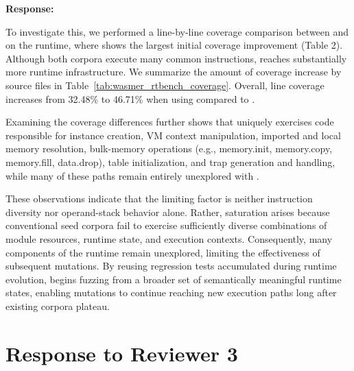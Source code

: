\documentclass[11pt]{article}
\newenvironment{response}{%
    \par\vspace{10pt}
    \par\noindent\textbf{\color{tseblue}Response:}\par\nobreak\ignorespaces
}{%
    \par\vspace{15pt}
}
\newcounter{reviewernum}
\newcounter{cmtcounter}[reviewernum]
\newcommand{\newreviewer}{\stepcounter{reviewernum}\setcounter{cmtcounter}{0}}
\begin{document}
\begin{response}
    To investigate this, we performed a line-by-line coverage comparison between \rtbench{} and \wasmbench{} on the \wasmer{} runtime, where \rtbench{} shows the largest initial coverage improvement (Table 2). Although both corpora execute many common instructions, \rtbench{} reaches substantially more runtime infrastructure. We summarize the amount of coverage increase by \wasmer{} source files in Table~\ref{tab:wasmer_rtbench_coverage}. Overall, line coverage increases from 32.48\% to 46.71\% when using \rtbench{} compared to \wasmbench{}.
    
    Examining the coverage differences further shows that \rtbench{} uniquely exercises code responsible for instance creation, VM context manipulation, imported and local memory resolution, bulk-memory operations (e.g., memory.init, memory.copy, memory.fill, data.drop), table initialization, and trap generation and handling, while many of these paths remain entirely unexplored with \wasmbench{}.
    
    These observations indicate that the limiting factor is neither instruction diversity nor operand-stack behavior alone. Rather, saturation arises because conventional seed corpora fail to exercise sufficiently diverse combinations of module resources, runtime state, and execution contexts. Consequently, many components of the runtime remain unexplored, limiting the effectiveness of subsequent mutations. By reusing regression tests accumulated during runtime evolution, \rtbench{} begins fuzzing from a broader set of semantically meaningful runtime states, enabling mutations to continue reaching new execution paths long after existing corpora plateau.

\end{response}

\clearpage

\section{Response to Reviewer 3}
\newreviewer
\end{document}
